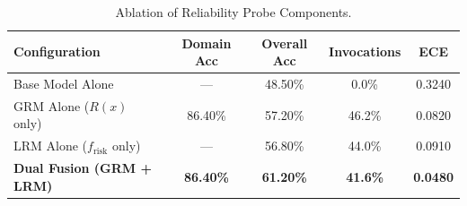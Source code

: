 \begin{table}[h]
\centering
\small
\caption{Ablation of Reliability Probe Components.}
\label{tab:ablation}
\begin{tabular}{lcccc}
\toprule
\textbf{Configuration} & \textbf{Domain Acc} & \textbf{Overall Acc} & \textbf{Invocations} & \textbf{ECE} \\
\midrule
Base Model Alone & --- & 48.50\% & 0.0\% & 0.3240 \\
GRM Alone ($R(x)$ only) & 86.40\% & 57.20\% & 46.2\% & 0.0820 \\
LRM Alone ($f_{\text{risk}}$ only) & --- & 56.80\% & 44.0\% & 0.0910 \\
\textbf{Dual Fusion (GRM + LRM)} & \textbf{86.40\%} & \textbf{61.20\%} & \textbf{41.6\%} & \textbf{0.0480} \\
\bottomrule
\end{tabular}
\end{table}
